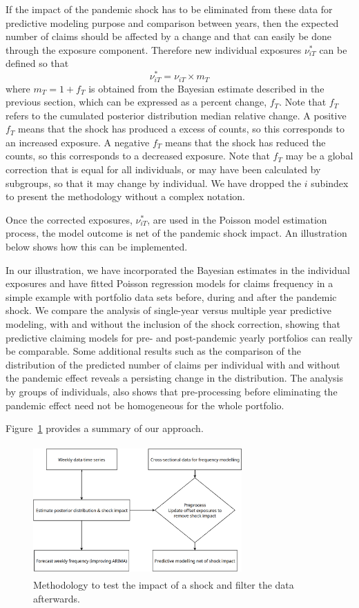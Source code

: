 \documentclass[]{risa}
\begin{document}
If the impact of the pandemic shock has to be eliminated from these data for predictive modeling purpose and comparison between years, then the expected number of claims should be affected by a change and that can easily be done through the exposure component. Therefore new individual exposures $\nu^*_{iT}$ can be defined so that
$$
\nu^*_{iT}=\nu_{iT} \times m_T
$$
where $m_T=1+f_T$ is obtained from the Bayesian estimate described in the previous section, which can be expressed as a percent change, $f_T$. Note that $f_T$ refers to the cumulated posterior distribution median relative change. A positive $f_T$ means that the shock has produced a excess of counts, so this corresponds to an increased exposure. A negative $f_T$ means that the shock has reduced the counts, so this corresponds to a decreased exposure. Note that $f_T$ may be a global correction that is equal for all individuals, or may have been calculated by subgroups, so that it may change by individual. We have dropped the $i$ subindex to present the methodology without a complex notation.

Once the corrected exposures, $\nu^*_{iT}$, are used in the Poisson model estimation process, the model outcome is net of the pandemic shock impact. An illustration below shows how this can be implemented.

In our illustration, we have incorporated the Bayesian estimates in the individual exposures and have fitted Poisson regression models for claims frequency in a simple example with portfolio data sets before, during and after the pandemic shock. We compare the analysis of single-year versus multiple year predictive modeling, with and without the inclusion of the shock correction, showing that predictive claiming models for pre- and post-pandemic yearly portfolios can really be comparable. Some additional results such as the comparison of the distribution of the predicted number of claims per individual with and without the pandemic effect reveals a persisting change in the distribution. The analysis by groups of individuals, also shows that pre-processing before eliminating the pandemic effect need not be homogeneous for the whole portfolio.

Figure~\ref{fig0} provides a summary of our approach.
\begin{center}
  \begin{figure}[h]
    \includegraphics[width=8cm, height=5cm]{Diagrama1.png}\caption{Methodology to test the impact of a shock and filter the data afterwards.}\label{fig0}
  \end{figure}
	\end{center}
	
\end{document}
